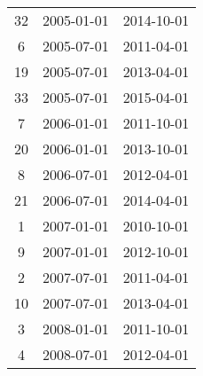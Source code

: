 \begin{tabular}{ccc}
  32 & 2005-01-01 & 2014-10-01 \\ 
  6 & 2005-07-01 & 2011-04-01 \\ 
  19 & 2005-07-01 & 2013-04-01 \\ 
  33 & 2005-07-01 & 2015-04-01 \\ 
  7 & 2006-01-01 & 2011-10-01 \\ 
  20 & 2006-01-01 & 2013-10-01 \\ 
  8 & 2006-07-01 & 2012-04-01 \\ 
  21 & 2006-07-01 & 2014-04-01 \\ 
  1 & 2007-01-01 & 2010-10-01 \\ 
  9 & 2007-01-01 & 2012-10-01 \\ 
  2 & 2007-07-01 & 2011-04-01 \\ 
  10 & 2007-07-01 & 2013-04-01 \\ 
  3 & 2008-01-01 & 2011-10-01 \\ 
  4 & 2008-07-01 & 2012-04-01 \\ 
   \hline
\end{tabular}
